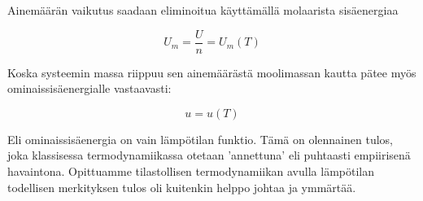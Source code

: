 \documentclass[12pt,a4paper,finnish]{book}
\begin{document}
Ainemäärän vaikutus saadaan eliminoitua käyttämällä molaarista sisäenergiaa

\begin{equation}
 U_m = \frac{U}{n} = U_m(T)
\end{equation}

Koska systeemin massa riippuu sen ainemäärästä moolimassan kautta pätee myös ominaissisäenergialle vastaavasti:

\begin{equation}
 u = u(T)
\end{equation}

Eli ominaissisäenergia on vain lämpötilan funktio. Tämä on olennainen tulos, joka klassisessa termodynamiikassa 
otetaan 'annettuna' eli puhtaasti empiirisenä havaintona. Opittuamme tilastollisen termodynamiikan avulla lämpötilan 
todellisen merkityksen tulos oli kuitenkin helppo johtaa ja ymmärtää.
\end{document}
